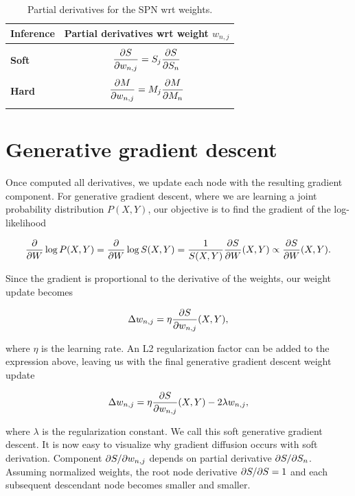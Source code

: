 \begin{table}[h]
  \centering
  \begin{tabular}{l|c}
    \hline
    \multicolumn{1}{c}{\bfseries Inference} & \multicolumn{1}{c}{\bfseries Partial derivatives wrt
      weight $w_{n,j}$}\\
    \hline & \\
    \textbf{Soft} & \(\displaystyle \frac{\partial S}{\partial w_{n,j}} = S_j\frac{\partial S}{\partial S_n} \) \\
    & \\
    \textbf{Hard} & \(\displaystyle \frac{\partial M}{\partial w_{n,j}} = M_j\frac{\partial M}{\partial M_n} \) \\
    & \\
    \hline
  \end{tabular}
  \caption{Partial derivatives for the SPN wrt weights.\label{tab:derivatives_weight}}
\end{table}

\section{Generative gradient descent}

Once computed all derivatives, we update each node with the resulting gradient component. For
generative gradient descent, where we are learning a joint probability distribution $P(X,Y)$, our
objective is to find the gradient of the log-likelihood

\begin{equation*}
  \frac{\partial}{\partial W}\log P(X,Y)=\frac{\partial}{\partial W}\log S(X,Y)=\frac{1}{S(X,Y)}\frac{\partial S}{\partial W}(X,Y)\propto
    \frac{\partial S}{\partial W}(X,Y).
\end{equation*}

Since the gradient is proportional to the derivative of the weights, our weight update becomes

\begin{equation*}
  \Delta w_{n,j}=\eta\frac{\partial S}{\partial w_{n,j}}(X, Y),
\end{equation*}

where $\eta$ is the learning rate. An L2 regularization factor can be added to the expression
above, leaving us with the final generative gradient descent weight update

\begin{equation}\label{eq:gen_weight_update}
  \Delta w_{n,j}=\eta\frac{\partial S}{\partial w_{n,j}}(X, Y)-2\lambda w_{n,j},
\end{equation}

where $\lambda$ is the regularization constant. We call this soft generative gradient descent. It
is now easy to visualize why gradient diffusion occurs with soft derivation. Component
$\partial S/\partial w_{n,j}$ depends on partial derivative $\partial S/\partial S_n$. Assuming normalized weights,
the root node derivative $\partial S/\partial S=1$ and each subsequent descendant node becomes smaller and
smaller.

